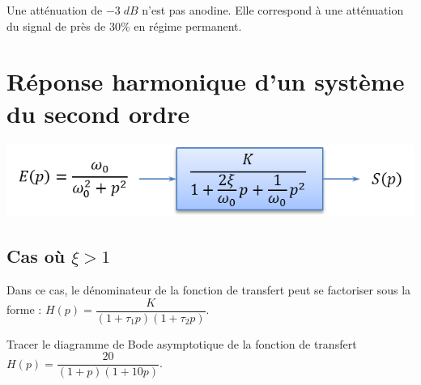 \documentclass[10pt,oneside]{article}
\begin{document}
\begin{warn}
Une atténuation de $-3\; dB$ n'est pas anodine. Elle correspond à une atténuation du signal de près de 30\% en régime permanent.
\end{warn}

\section{Réponse harmonique d'un système du second ordre}

\begin{minipage}[c]{.48\linewidth}
\begin{center}
\includegraphics[width=.9\textwidth]{png/ordre2_bloc}
\end{center}
\end{minipage}\hfill
\begin{minipage}[c]{.48\linewidth}
\begin{center}

\end{center}
\end{minipage}

\subsection{Cas où $\xi>1$}
Dans ce cas, le dénominateur de la fonction de transfert peut se factoriser sous la forme :
$H(p)=\dfrac{K}{\left(1+\tau_1 p \right)\left(1+\tau_2 p \right)}$.

Tracer le diagramme de Bode asymptotique de la fonction de transfert 
$H(p)=\dfrac{20}{\left(1+ p \right)\left(1+10 p \right)}$.
\end{document}
